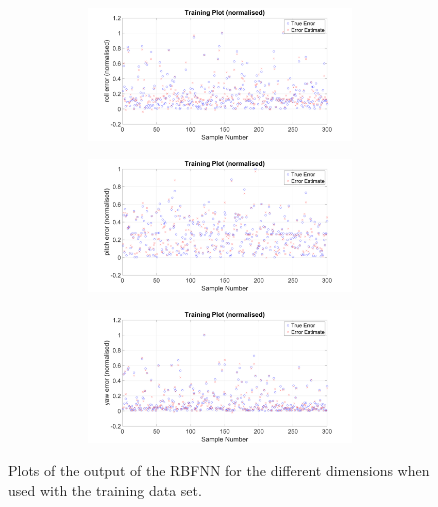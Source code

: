 \begin{figure}
\begin{subfigure}{0.48\textwidth}
\begin{subfigure}{\textwidth}
    \end{subfigure}
    \caption{}
  \end{subfigure}
  \begin{subfigure}{0.48\textwidth}
    \begin{subfigure}{\textwidth}
      \includegraphics[clip, trim = 80 0 100 0, width=\textwidth]{figures/chapter4/tr_roll}
    \end{subfigure}
    \begin{subfigure}{\textwidth}
      \includegraphics[clip, trim = 80 0 100 0, width=\textwidth]{figures/chapter4/tr_pitch}
    \end{subfigure}
    \begin{subfigure}{\textwidth}
      \includegraphics[clip, trim = 80 0 100 0, width=\textwidth]{figures/chapter4/tr_yaw}
    \end{subfigure}
    \caption{}
  \end{subfigure}
  \caption[The output of the RBFNN when used with the training set input.]{Plots of the output of the RBFNN for the different dimensions when used with the training data set.}
  \label{fig:chap4-rbf-train}
\end{figure}

